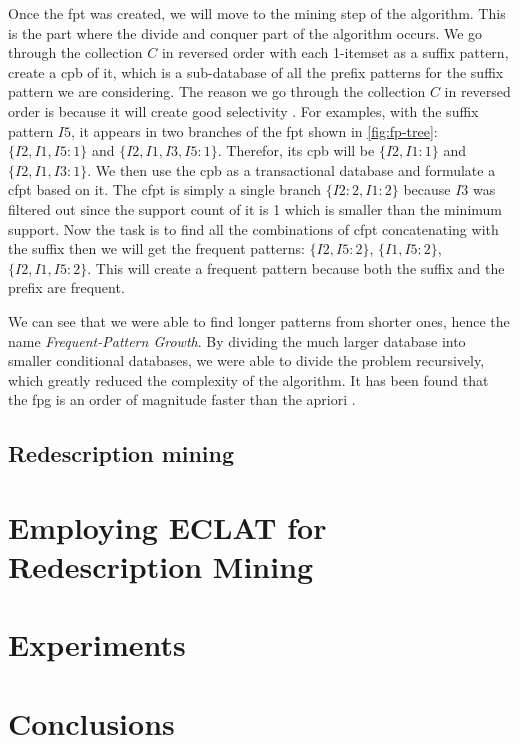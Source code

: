 Once the \acl{fpt} was created, we will move to the mining step of the algorithm.
This is the part where the divide and conquer part of the algorithm occurs.
We go through the collection $C$ in reversed order with each 1-itemset as a suffix pattern, create a \acl{cpb} of it, which is a sub-database of all the prefix patterns for the suffix pattern we are considering.
The reason we go through the collection $C$ in reversed order is because it will create good selectivity \citep{han2012mining}.
For examples, with the suffix pattern $I5$, it appears in two branches of the \acl{fpt} shown in \autoref{fig:fp-tree}: $\{I2, I1, I5: 1\}$ and $\{I2, I1, I3, I5: 1\}$.
Therefor, its \acl{cpb} will be $\{I2, I1: 1\}$ and $\{I2, I1, I3: 1\}$.
We then use the \acl{cpb} as a transactional database and formulate a \acl{cfpt} based on it.
The \acl{cfpt} is simply a single branch $\{I2:2, I1:2\}$ because $I3$ was filtered out since the support count of it is 1 which is smaller than the minimum support.
Now the task is to find all the combinations of \acl{cfpt} concatenating with the suffix then we will get the frequent patterns: $\{I2, I5: 2\}$, $\{I1, I5: 2\}$, $\{I2, I1, I5: 2\}$.
This will create a frequent pattern because both the suffix and the prefix are frequent.

We can see that we were able to find longer patterns from shorter ones, hence the name \textit{Frequent-Pattern Growth}.
By dividing the much larger database into smaller conditional databases, we were able to divide the problem recursively, which greatly reduced the complexity of the algorithm.
It has been found that the \acl{fpg} is an order of magnitude faster than the \acl{apriori} \citep{han2012mining}.

\section{Redescription mining}


\chapter{Employing ECLAT for Redescription Mining}
\label{cha:employment}

\chapter{Experiments}
\label{cha:experiments}

\chapter{Conclusions}
\label{cha:conclusions}
